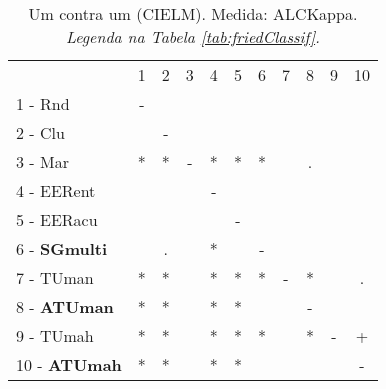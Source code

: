 \begin{table}[h]
\caption{Um contra um (CIELM). Medida: ALCKappa. \textit{Legenda na Tabela \ref{tab:friedClassif}.}}
\begin{center}\begin{tabular}{lcc|cc|cc|cc|cc}
 			& 1 & 2 & 3 & 4 & 5 & 6 & 7 & 8 & 9 & 10\\
1 - Rnd  	& - &   &   &   &   &   &   &   &   &   \\
2 - Clu  	&   & - &   &   &   &   &   &   &   &   \\ \hline
3 - Mar  	& * & * & - & * & * & * &   & . &   &   \\
4 - EERent	&   &   &   & - &   &   &   &   &   &   \\ \hline
5 - EERacu	&   &   &   &   & - &   &   &   &   &   \\
6 - \textbf{SGmulti}	&   & . &   & * &   & - &   &   &   &   \\ \hline
7 - TUman	& * & * &   & * & * & * & - & * &   & . \\
8 - \textbf{ATUman}	& * & * &   & * & * &   &   & - &   &   \\ \hline
9 - TUmah	& * & * &   & * & * & * &   & * & - & + \\
10 - \textbf{ATUmah}	& * & * &   & * & * &   &   &   &   & - \\ \hline\end{tabular}
\label{stratsALCKappaFriedCIELMRedux}
\end{center}
\end{table}